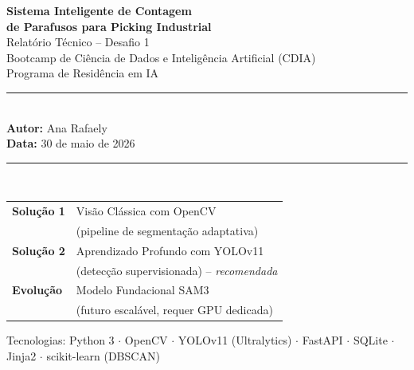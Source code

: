 \documentclass[12pt,a4paper]{article}
\begin{document}
\begin{titlepage}
  \centering
  \vspace*{1.8cm}
  {\huge\bfseries\color{primary}
    Sistema Inteligente de Contagem\\[0.4em]
    de Parafusos para Picking Industrial\\[1.2em]}
  {\large\color{darkgray}
    Relat\'orio T\'ecnico -- Desafio 1\\
    Bootcamp de Ci\^encia de Dados e Intelig\^encia Artificial (CDIA)\\
    Programa de Resid\^encia em IA\\[1.8cm]}
  \rule{\linewidth}{0.5pt}\\[0.4em]
  {\normalsize
    \textbf{Autor:} Ana Rafaely\\[0.3em]
    \textbf{Data:} 30 de maio de 2026\\[0.3em]
  }
  \rule{\linewidth}{0.5pt}\\[1.2cm]
  \begin{tcolorbox}[colback=lightblue, colframe=primary, arc=6pt,
                    title={\bfseries Solu\c{c}\~oes desenvolvidas e comparadas \quad(vers\~ao 2)}]
    \begin{tabular}{ll}
      \textbf{Solu\c{c}\~ao 1} & Vis\~ao Cl\'assica com OpenCV\\
                                & (pipeline de segmenta\c{c}\~ao adaptativa)\\[4pt]
      \textbf{Solu\c{c}\~ao 2} & Aprendizado Profundo com YOLOv11\\
                                & (detec\c{c}\~ao supervisionada) -- \emph{recomendada}\\[4pt]
      \textbf{Evolu\c{c}\~ao}  & Modelo Fundacional SAM3\\
                                & (futuro escal\'avel, requer GPU dedicada)\\
    \end{tabular}
  \end{tcolorbox}
  \vfill
  {\small\color{gray}
    Tecnologias: Python 3 $\cdot$ OpenCV $\cdot$ YOLOv11 (Ultralytics) $\cdot$
    FastAPI $\cdot$ SQLite $\cdot$ Jinja2 $\cdot$ scikit-learn (DBSCAN)
  }
\end{titlepage}
\tableofcontents
\newpage

\end{document}
